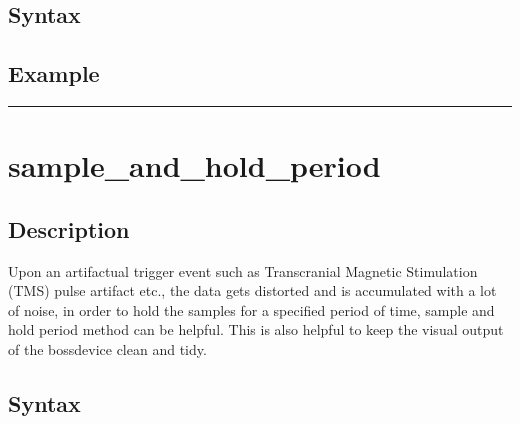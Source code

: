 \documentclass[letterpaper,10pt,english]{sphinxmanual}
\begin{document}
\subsection{Syntax}
\label{\detokenize{4_api_documentation:id46}}
\begin{sphinxVerbatim}[commandchars=\\\{\}]
\end{sphinxVerbatim}


\subsection{Example}
\label{\detokenize{4_api_documentation:id47}}
\begin{sphinxVerbatim}[commandchars=\\\{\}]
 
\end{sphinxVerbatim}


\bigskip\hrule\bigskip



\section{sample\_and\_hold\_period}
\label{\detokenize{4_api_documentation:sample-and-hold-period}}

\subsection{Description}
\label{\detokenize{4_api_documentation:id48}}
Upon an artifactual trigger event such as Trans\sphinxhyphen{}cranial Magnetic Stimulation (TMS) pulse artifact etc., the data gets distorted and is accumulated with a lot of noise, in order to hold the samples for a specified period of time, sample and hold period method can be helpful. This is also helpful to keep the visual output of the bossdevice clean and tidy.


\subsection{Syntax}
\label{\detokenize{4_api_documentation:id49}}
\begin{sphinxVerbatim}[commandchars=\\\{\}]
  \PYG{p}{[}\PYG{p}{]} 
\end{sphinxVerbatim}
\end{document}
